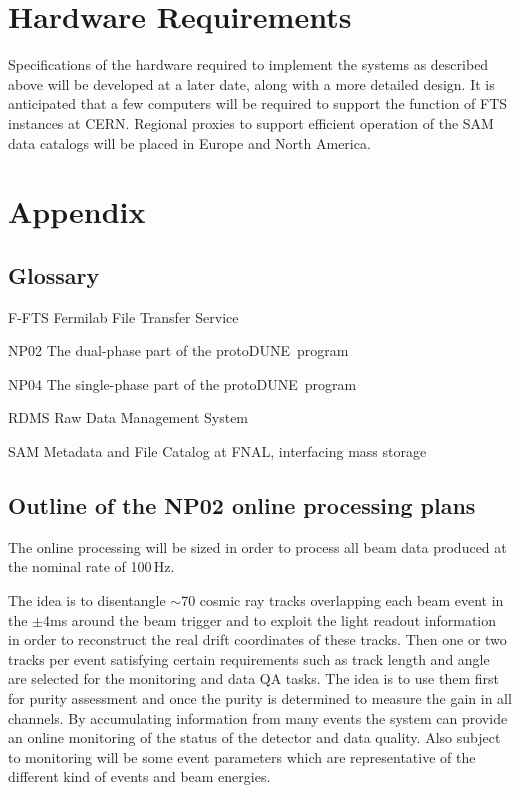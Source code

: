 \documentclass[pdftex,12pt,letter]{article}
\newcommand{\pd}{protoDUNE\ }
\begin{document}
\section{Hardware Requirements}
Specifications of the hardware required to implement the systems as described above will be developed at a later date, along with a more detailed
design. It is anticipated that a few computers will be required to support the function of FTS instances at CERN. Regional proxies to support efficient operation
of the SAM data catalogs will be placed in Europe and North America.

\newpage
\appendix
\section{Appendix}
\subsection{Glossary}
\begin{description}
\item{F-FTS} Fermilab File Transfer Service
\item{NP02} The dual-phase part of the \pd program
\item{NP04} The single-phase part of the \pd program
\item{RDMS} Raw Data Management System
\item{SAM} Metadata and File Catalog at FNAL, interfacing mass storage
\end{description}

\subsection{Outline of the NP02 online processing plans}
\label{sec:np02_online_processing}
The online processing will be sized in order to process all beam data produced at the nominal rate of 100\,Hz. 

The idea is to disentangle $\sim$70 cosmic ray tracks overlapping each beam event in the $\pm$4ms around the beam trigger
and to exploit the light readout information in order to reconstruct the real drift coordinates of these tracks.
Then one or two tracks per event satisfying certain requirements such as track length and angle are selected for the monitoring and
data QA tasks. The idea is to use them first for purity assessment and once the purity is determined to measure the gain in all
channels. By accumulating information from many events the system can provide an online monitoring of the status of the detector
and data quality. Also subject to monitoring will be some event parameters which are representative of the different kind of events and
beam energies.
\end{document}
